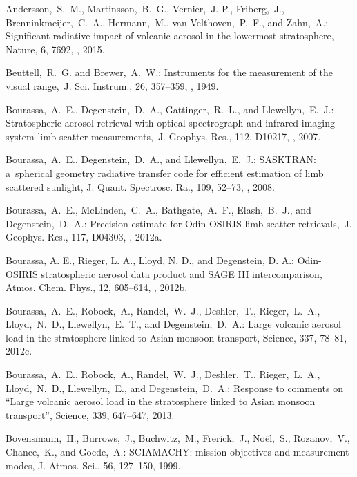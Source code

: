 \documentclass[amt]{copernicus}
\begin{document}
\begin{thebibliography}{99}

Andersson,~S.~M., Martinsson,~B.~G., Vernier,~J.-P., Friberg,~J.,
Brenninkmeijer,~C.~A., Hermann,~M., van Velthoven,~P.~F., and Zahn,~A.:
Significant radiative impact of volcanic aerosol in the lowermost
stratosphere, Nature, 6, 7692, , 2015.


Beuttell,~R.~G. and Brewer,~A.~W.: Instruments for the measurement of the
visual range,~J. Sci. Instrum., 26, 357--359,
, 1949.


Bourassa,~A.~E., Degenstein,~D.~A., Gattinger,~R.~L., and Llewellyn,~E.~J.:
Stratospheric aerosol retrieval with optical spectrograph and infrared
imaging system limb scatter measurements,~J. Geophys. Res., 112, D10217,
,
2007.


Bourassa,~A.~E., Degenstein,~D.~A., and Llewellyn,~E.~J.: SASKTRAN:
a~spherical geometry radiative transfer code for efficient estimation of limb
scattered sunlight, J. Quant. Spectrosc. Ra., 109, 52--73,
,
2008.


Bourassa,~A.~E., McLinden,~C.~A., Bathgate,~A.~F., Elash,~B.~J., and
Degenstein,~D.~A.: Precision estimate for Odin-OSIRIS limb scatter
retrievals,~J. Geophys. Res., 117, D04303,
, 2012a.


Bourassa, A. E., Rieger, L. A., Lloyd, N. D., and Degenstein, D. A.:
Odin-OSIRIS stratospheric aerosol data product and SAGE III intercomparison,
Atmos. Chem. Phys., 12, 605--614, , 2012b.


Bourassa,~A.~E., Robock,~A., Randel,~W.~J., Deshler,~T.,
  Rieger,~L.~A., Lloyd,~N.~D., Llewellyn,~E.~T., and
  Degenstein,~D.~A.: Large volcanic aerosol load in the stratosphere
  linked to Asian monsoon transport, Science, 337, 78--81,
  2012c.


Bourassa,~A.~E., Robock,~A., Randel,~W.~J., Deshler,~T., Rieger,~L.~A.,
Lloyd,~N.~D., Llewellyn,~E., and Degenstein,~D.~A.: Response to comments on
``Large volcanic aerosol load in the stratosphere linked to Asian monsoon
transport'', Science, 339, 647--647, 2013.


Bovensmann,~H., Burrows,~J., Buchwitz,~M., Frerick,~J., No\"{e}l,~S.,
Rozanov,~V., Chance,~K., and Goede,~A.: SCIAMACHY: mission objectives and
measurement modes, J. Atmos. Sci., 56, 127--150, 1999.



\end{thebibliography}
\end{document}

